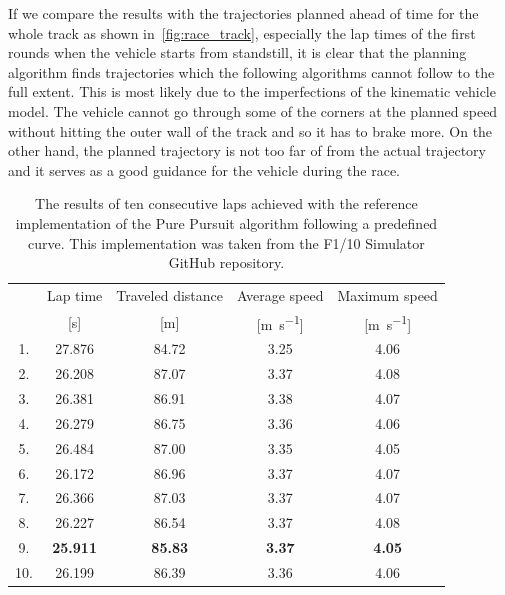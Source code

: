 If we compare the results with the trajectories planned ahead of time for the whole track as shown in~\ref{fig:race_track}, especially the lap times of the first rounds when the vehicle starts from standstill, it is clear that the planning algorithm finds trajectories which the following algorithms cannot follow to the full extent. This is most likely due to the imperfections of the kinematic vehicle model. The vehicle cannot go through some of the corners at the planned speed without hitting the outer wall of the track and so it has to brake more. On the other hand, the planned trajectory is not too far of from the actual trajectory and it serves as a good guidance for the vehicle during the race.

\begin{table}
	\centering
	\begin{tabular}{c c c c c}
		\toprule
		& Lap time       & Traveled distance  & Average speed             & Maximum speed             \\
		& [\si{\second}] & [\si{\meter}]      & [\si{\meter\per\second}]  & [\si{\meter\per\second}]  \\
		\midrule
		1. & 27.876 & 84.72 & 3.25 & 4.06 \\
		2. & 26.208 & 87.07 & 3.37 & 4.08 \\
		3. & 26.381 & 86.91 & 3.38 & 4.07 \\
		4. & 26.279 & 86.75 & 3.36 & 4.06 \\
		5. & 26.484 & 87.00 & 3.35 & 4.05 \\
		6. & 26.172 & 86.96 & 3.37 & 4.07 \\
		7. & 26.366 & 87.03 & 3.37 & 4.07 \\
		8. & 26.227 & 86.54 & 3.37 & 4.08 \\
		9. & \textbf{25.911} & \textbf{85.83} & \textbf{3.37} & \textbf{4.05} \\
		10. & 26.199 & 86.39 & 3.36 & 4.06 \\
		\bottomrule
	\end{tabular}
	\caption{The results of ten consecutive laps achieved with the reference implementation of the Pure Pursuit algorithm following a predefined curve. This implementation was taken from the F1/10 Simulator GitHub repository.}
	\label{tbl:reference-impl}
\end{table}


